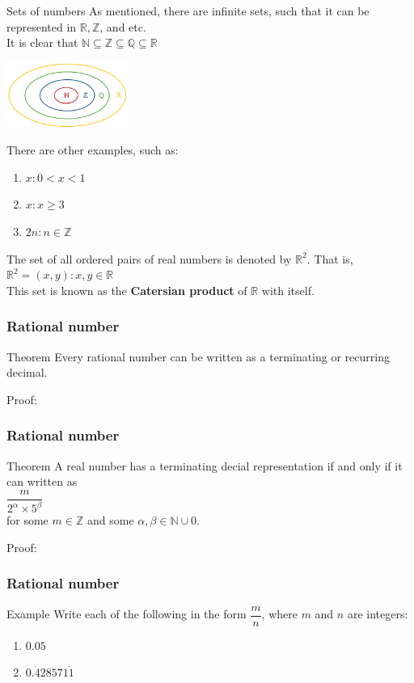 \documentclass[
	11pt, %
]{beamer}
\begin{document}
\begin{frame}{Sets of numbers}
    As mentioned, there are infinite sets, such that it can be represented in $\mathbb{R}, \mathbb{Z}$, and etc.\\
    It is clear that $\mathbb{N} \subseteq \mathbb{Z} \subseteq \mathbb{Q} \subseteq \mathbb{R}$
    \begin{center}
        \includegraphics[width=0.3\textwidth]{Venn2.png}
    \end{center}
    There are other examples, such as:
    \begin{enumerate}
        \item ${x: 0<x<1}$
        \item ${x: x\geq 3}$
        \item ${2n: n\in \mathbb{Z}}$
    \end{enumerate}
    The set of all ordered pairs of real numbers is denoted by $\mathbb{R}^2$. That is,\\
    $\mathbb{R}^2 = {(x,y): x, y \in \mathbb{R}}$\\
    This set is known as the \textbf{Catersian product} of $\mathbb{R}$ with itself.
\end{frame}

\begin{frame}[t]
    \frametitle{Rational number}
    \begin{block}{Theorem}
        Every rational number can be written as a terminating or recurring decimal.
    \end{block}
    Proof: 
\end{frame}

\begin{frame}[t]
    \frametitle{Rational number}
    \begin{block}{Theorem}
        A real number has a terminating decial representation if and only if it can written as\\
        $\dfrac{m}{2^\alpha \times 5^\beta}$\\
        for some $m \in \mathbb{Z}$ and some $\alpha, \beta \in \mathbb{N} \cup {0}$.
    \end{block}
    Proof: 
\end{frame}

\begin{frame}[t]
    \frametitle{Rational number}
    \begin{block}{Example}
        Write each of the following in the form $\dfrac{m}{n}$, where $m$ and $n$ are integers:\\
        \begin{enumerate}[a]
            \item $0.05$
            \item $0.\dot{4}28571\dot{1}$
        \end{enumerate}
    \end{block}
\end{frame}
\begin{frame}
\end{frame}
\end{document}
